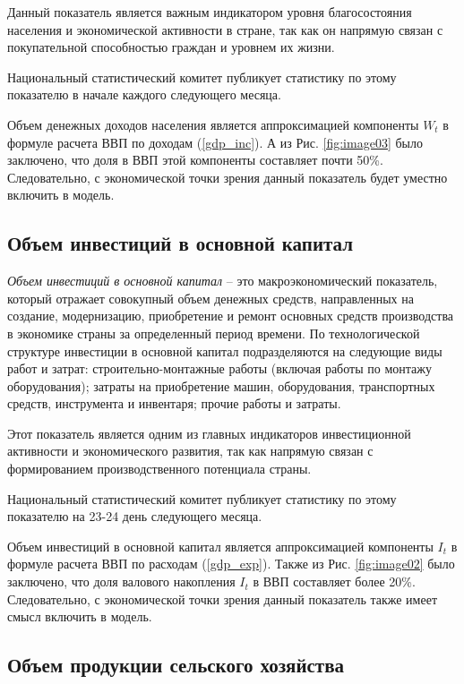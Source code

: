 \documentclass[a4paper, 14pt]{extreport}
\numberwithin{equation}{section}
\numberwithin{equation}{section}
\begin{document}
	Данный показатель является важным индикатором уровня благосостояния населения и экономической активности в стране, так как он напрямую связан с покупательной способностью граждан и уровнем их жизни.	
	
	Национальный статистический комитет публикует статистику по этому показателю в начале каждого следующего месяца.
	
	Объем денежных доходов населения является аппроксимацией компоненты $W_t$ в формуле расчета ВВП по доходам (\ref{gdp_inc}). А из Рис. \ref{fig:image03} было заключено, что доля в ВВП этой компоненты составляет почти 50\%. Следовательно, с экономической точки зрения данный показатель будет уместно включить в модель.
	
	\subsection{Объем инвестиций в основной капитал}
	
	\textit{Объем инвестиций в основной капитал} -- это макроэкономический показатель, который отражает совокупный объем денежных средств, направленных на создание, модернизацию, приобретение и ремонт основных средств производства в экономике страны за определенный период времени. По технологической структуре инвестиции в основной капитал подразделяются на следующие виды работ и затрат: строительно-монтажные работы (включая работы по монтажу оборудования); затраты на приобретение машин, оборудования, транспортных средств, инструмента и инвентаря; прочие работы и затраты.
	
	Этот показатель является одним из главных индикаторов инвестиционной активности и экономического развития, так как напрямую связан с формированием производственного потенциала страны.
	
	Национальный статистический комитет публикует статистику по этому показателю на 23-24 день следующего месяца.
	
	Объем инвестиций в основной капитал является аппроксимацией компоненты $I_t$ в формуле расчета ВВП по расходам (\ref{gdp_exp}). Также из Рис. \ref{fig:image02} было заключено, что доля валового накопления $I_t$ в ВВП составляет более 20\%. Следовательно, с экономической точки зрения данный показатель также имеет смысл включить в модель.
	
	\subsection{Объем продукции сельского хозяйства}
	
\end{document}

